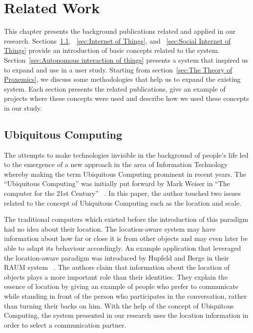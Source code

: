 \chapter{Related Work}
\label{ch:related-work}
This chapter presents the background publications related and applied in our research.
Sections~\ref{sec:Ubiquitous Computing}, ~\ref{sec:Internet of Things}, and ~\ref{sec:Social Internet of Things}
provide an introduction of basic concepts related to the system.
Section~\ref{sec:Autonomous interaction of things} presents a system that inspired us to expand
and use in a user study.
Starting from section~\ref{sec:The Theory of Proxemics}, we discuss some methodologies
that help us to expand the existing system.
Each section presents the related publications, give an example of projects where these concepts
were used and describe how we used these concepts in our study.

\section{Ubiquitous Computing}
\label{sec:Ubiquitous Computing}
The attempts to make technologies invisible in the background of people’s life led to the emergence
of a new approach in the area of Information Technology whereby making the term
Ubiquitous Computing prominent in recent years.
The “Ubiquitous Computing” was initially put forward by Mark Weiser
in “The computer for the 21st Century” ~\cite{weiser2002computer}.
In this paper, the author touched two issues related to the concept of
Ubiquitous Computing such as the location and scale.

The traditional computers which existed before the introduction of this
paradigm had no idea about their location.
The location-aware system may have information about how far or close it is from other
objects and may even later be able to adapt its behaviour accordingly.
An example application that leveraged the location-aware paradigm was introduced by
Hupfeld and Berge in their RAUM system ~\cite{hupfeld2000spatially}.
The authors claim that information about the location of objects plays
a more important role than their identities.
They explain the essence of location by giving an example of people who prefer to communicate
while standing in front of the person who participates in the conversation, rather than turning their backs on him.
With the help of the concept of Ubiquitous Computing, the system presented in our
research uses the location information in order to select a communication partner.


